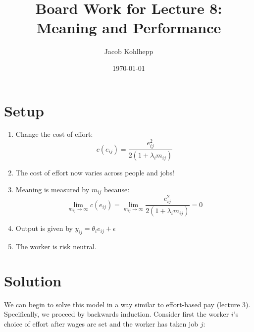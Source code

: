 \documentclass{article}
\title{Board Work for Lecture 8: Meaning and Performance}
\author{Jacob Kohlhepp}
\date{\today}
\begin{document}
\maketitle

\section{Setup}

\begin{enumerate}
    \item Change the cost of effort:
    \[c(e_{ij}) = \frac{e_{ij}^2}{2(1+\lambda_i m_{ij})} \]

    \item The cost of effort now varies across people and jobs!
    \item Meaning is measured by $m_{ij}$ because:
    \[\lim_{m_{ij}\to \infty} c(e_{ij})= \lim_{m_{ij}\to \infty}\frac{e_{ij}^2}{2(1+\lambda_i m_{ij})}=0\]
    \item Output is given by $y_{ij}=\theta_i e_{ij} + \epsilon$
    \item The worker is risk neutral.
    
\end{enumerate}

\section{Solution}

We can begin to solve this model in a way similar to effort-based pay (lecture 3). Specifically, we proceed by backwards induction. Consider first the worker $i$'s choice of effort after wages are set and the worker has taken job $j$:
\end{document}
